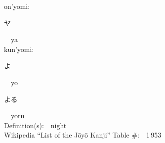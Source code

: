 \begin{multicols}{2}
{\hspace*{1em}}on'yomi:\ \ \\
{\hspace*{2em}}{\begin{CJK}{UTF8}{min} ヤ \end{CJK}}\ \ ya\ \ \\
{\hspace*{1em}}kun'yomi:\ \ \\
{\hspace*{2em}}{\begin{CJK}{UTF8}{min} よ \end{CJK}}\ \ yo\ \ \\
{\hspace*{2em}}{\begin{CJK}{UTF8}{min} よる \end{CJK}}\ \ yoru\ \ \\
Definition(s):\ \ night \\
Wikipedia ``List of the J\=oy\=o Kanji'' Table \#:\ \ 1\,953 \\
\ \ \\
\end{multicols}



